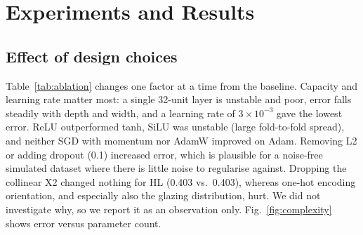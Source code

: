 \documentclass[conference]{IEEEtran}
\begin{document}
\section{Experiments and Results}
\subsection{Effect of design choices}\label{sec:ablation}
Table~\ref{tab:ablation} changes one factor at a time from the baseline. Capacity and learning rate matter most: a single 32-unit layer is unstable and poor, error falls steadily with depth and width, and a learning rate of $3\times10^{-3}$ gave the lowest error. ReLU outperformed tanh, SiLU was unstable (large fold-to-fold spread), and neither SGD with momentum nor AdamW improved on Adam. Removing L2 or adding dropout (0.1) increased error, which is plausible for a noise-free simulated dataset where there is little noise to regularise against. Dropping the collinear X2 changed nothing for HL (0.403 vs.\ 0.403), whereas one-hot encoding orientation, and especially also the glazing distribution, hurt. We did not investigate why, so we report it as an observation only. Fig.~\ref{fig:complexity} shows error versus parameter count.
\end{document}

